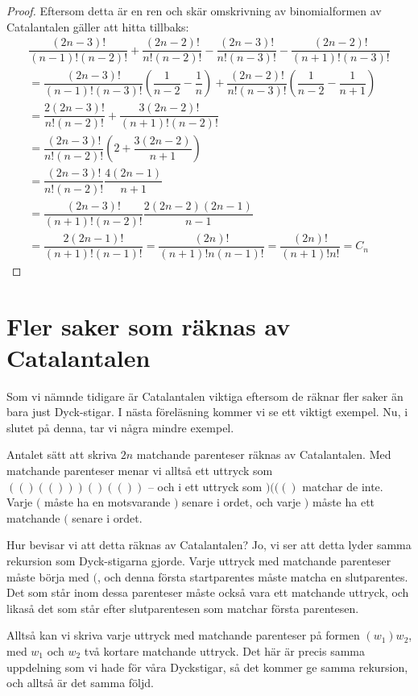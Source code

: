 \documentclass{tufte-handout}
\begin{document}
\begin{proof}
  Eftersom detta är en ren och skär omskrivning av binomialformen av Catalantalen gäller att hitta tillbaks:
  \begin{equation*}
    \begin{gathered}
      \dfrac{(2n-3)!}{(n-1)!(n-2)!}+\dfrac{(2n-2)!}{n!(n-2)!}-\dfrac{(2n-3)!}{n!(n-3)!}-\dfrac{(2n-2)!}{(n+1)!(n-3)!}\\
      = \dfrac{(2n-3)!}{(n-1)!(n-3)!}\left(\dfrac{1}{n-2}-\dfrac{1}{n}\right)+\dfrac{(2n-2)!}{n!(n-3)!}\left(\dfrac{1}{n-2}-\dfrac{1}{n+1}\right)\\
      =\dfrac{2(2n-3)!}{n!(n-2)!}+\dfrac{3(2n-2)!}{(n+1)!(n-2)!}\\
      =\dfrac{(2n-3)!}{n!(n-2)!}\left(2+\dfrac{3(2n-2)}{n+1}\right)\\
      =\dfrac{(2n-3)!}{n!(n-2)!}\dfrac{4(2n-1)}{n+1}\\
      =\dfrac{(2n-3)!}{(n+1)!(n-2)!}\dfrac{2(2n-2)(2n-1)}{n-1}\\
      =\dfrac{2(2n-1)!}{(n+1)!(n-1)!}=\dfrac{(2n)!}{(n+1)!n(n-1)!} = \dfrac{(2n)!}{(n+1)!n!} = C_n
    \end{gathered}
  \end{equation*}
\end{proof}

\section{Fler saker som räknas av Catalantalen}

Som vi nämnde tidigare är Catalantalen viktiga eftersom de räknar fler saker än bara just Dyck-stigar. I nästa föreläsning kommer vi se ett viktigt exempel. Nu, i slutet på denna, tar vi några mindre exempel.

\begin{example}
    Antalet sätt att skriva $2n$ matchande parenteser räknas av Catalantalen. Med matchande parenteser menar vi alltså ett uttryck som $(()(()))()(())$ -- och i ett uttryck som $)((()$ matchar de inte. Varje $($ måste ha en motsvarande $)$ senare i ordet, och varje $)$ måste ha ett matchande $($ senare i ordet.

    Hur bevisar vi att detta räknas av Catalantalen? Jo, vi ser att detta lyder samma rekursion som Dyck-stigarna gjorde. Varje uttryck med matchande parenteser måste börja med $($, och denna första startparentes måste matcha en slutparentes. Det som står inom dessa parenteser måste också vara ett matchande uttryck, och likaså det som står efter slutparentesen som matchar första parentesen.

    Alltså kan vi skriva varje uttryck med matchande parenteser på formen $(w_1)w_2$, med $w_1$ och $w_2$ två kortare matchande uttryck. Det här är precis samma uppdelning som vi hade för våra Dyckstigar, så det kommer ge samma rekursion, och alltså är det samma följd.
\end{example}
\end{document}
